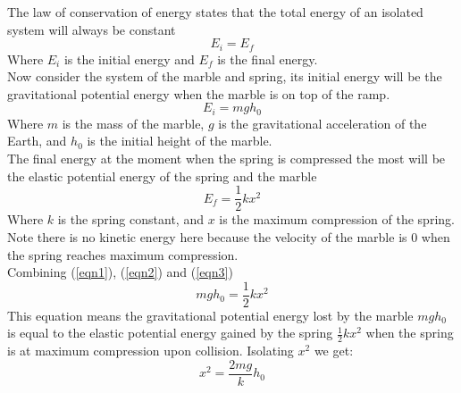The law of conservation of energy states that the total energy of an isolated system will always be constant
\begin{equation}
    E_i=E_f \label{eqn1}
\end{equation}
Where $E_i$ is the initial energy and $E_f$ is the final energy.\\
Now consider the system of the marble and spring, its initial energy will be the gravitational potential energy when the marble is on top of the ramp.
\begin{equation}
    E_i=mgh_0 \label{eqn2}
\end{equation}
Where $m$ is the mass of the marble, $g$ is the gravitational acceleration of the Earth, and $h_0$ is the initial height of the marble.\\
The final energy at the moment when the spring is compressed the most will be the elastic potential energy of the spring and the marble
\begin{equation}
    E_f=\frac{1}{2}kx^2 \label{eqn3}
\end{equation}
Where $k$ is the spring constant, and $x$ is the maximum compression of the spring.\\
Note there is no kinetic energy here because the velocity of the marble is 0 when the spring reaches maximum compression.\\
Combining (\ref{eqn1}), (\ref{eqn2}) and (\ref{eqn3})
\begin{equation}
    mgh_0=\frac{1}{2}kx^2
\end{equation}
This equation means the gravitational potential energy lost by the marble $mgh_0$ is equal to the elastic potential energy gained by the spring $\frac{1}{2}kx^2$ when the spring is at maximum compression upon collision.
Isolating $x^2$ we get:
\begin{equation}
    x^2=\frac{2mg}{k}h_0
\end{equation}